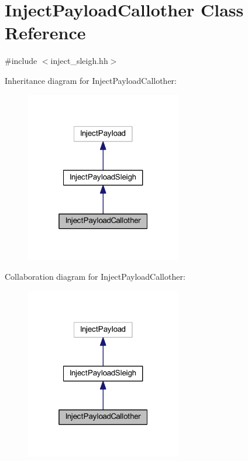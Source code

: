 \hypertarget{class_inject_payload_callother}{}\section{Inject\+Payload\+Callother Class Reference}
\label{class_inject_payload_callother}


{\ttfamily \#include $<$inject\+\_\+sleigh.\+hh$>$}



Inheritance diagram for Inject\+Payload\+Callother\+:
\nopagebreak
\begin{figure}[H]
\begin{center}
\leavevmode
\includegraphics[width=193pt]{class_inject_payload_callother__inherit__graph}
\end{center}
\end{figure}


Collaboration diagram for Inject\+Payload\+Callother\+:
\nopagebreak
\begin{figure}[H]
\begin{center}
\leavevmode
\includegraphics[width=193pt]{class_inject_payload_callother__coll__graph}
\end{center}
\end{figure}
